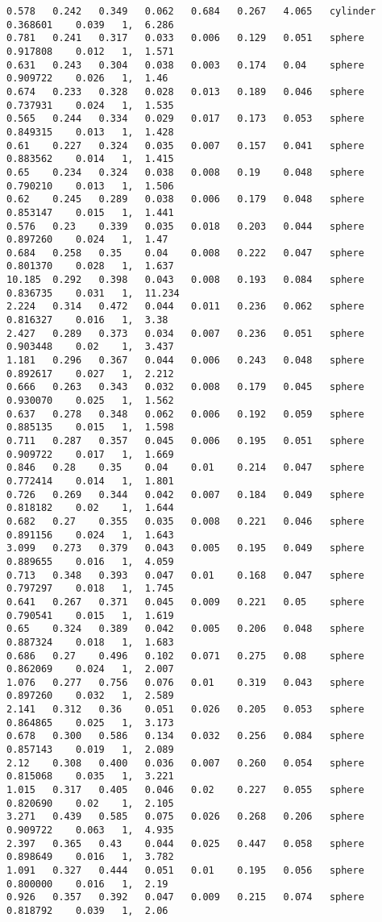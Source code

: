 {\fontsize{7.5}{10} \selectfont
\label{code:esferaAGC}
\begin{lstlisting}[caption={Datos obtenidos para la prueba de la esfera usando AGC.}]
0.578	0.242	0.349	0.062	0.684	0.267	4.065	cylinder	0.368601	0.039	1, 	6.286
0.781	0.241	0.317	0.033	0.006	0.129	0.051	sphere	0.917808	0.012	1, 	1.571
0.631	0.243	0.304	0.038	0.003	0.174	0.04	sphere	0.909722	0.026	1, 	1.46
0.674	0.233	0.328	0.028	0.013	0.189	0.046	sphere	0.737931	0.024	1, 	1.535
0.565	0.244	0.334	0.029	0.017	0.173	0.053	sphere	0.849315	0.013	1, 	1.428
0.61	0.227	0.324	0.035	0.007	0.157	0.041	sphere	0.883562	0.014	1, 	1.415
0.65	0.234	0.324	0.038	0.008	0.19	0.048	sphere	0.790210	0.013	1, 	1.506
0.62	0.245	0.289	0.038	0.006	0.179	0.048	sphere	0.853147	0.015	1, 	1.441
0.576	0.23	0.339	0.035	0.018	0.203	0.044	sphere	0.897260	0.024	1, 	1.47
0.684	0.258	0.35	0.04	0.008	0.222	0.047	sphere	0.801370	0.028	1, 	1.637
10.185	0.292	0.398	0.043	0.008	0.193	0.084	sphere	0.836735	0.031	1, 	11.234
2.224	0.314	0.472	0.044	0.011	0.236	0.062	sphere	0.816327	0.016	1, 	3.38
2.427	0.289	0.373	0.034	0.007	0.236	0.051	sphere	0.903448	0.02	1, 	3.437
1.181	0.296	0.367	0.044	0.006	0.243	0.048	sphere	0.892617	0.027	1, 	2.212
0.666	0.263	0.343	0.032	0.008	0.179	0.045	sphere	0.930070	0.025	1, 	1.562
0.637	0.278	0.348	0.062	0.006	0.192	0.059	sphere	0.885135	0.015	1, 	1.598
0.711	0.287	0.357	0.045	0.006	0.195	0.051	sphere	0.909722	0.017	1, 	1.669
0.846	0.28	0.35	0.04	0.01	0.214	0.047	sphere	0.772414	0.014	1, 	1.801
0.726	0.269	0.344	0.042	0.007	0.184	0.049	sphere	0.818182	0.02	1, 	1.644
0.682	0.27	0.355	0.035	0.008	0.221	0.046	sphere	0.891156	0.024	1, 	1.643
3.099	0.273	0.379	0.043	0.005	0.195	0.049	sphere	0.889655	0.016	1, 	4.059
0.713	0.348	0.393	0.047	0.01	0.168	0.047	sphere	0.797297	0.018	1, 	1.745
0.641	0.267	0.371	0.045	0.009	0.221	0.05	sphere	0.790541	0.015	1, 	1.619
0.65	0.324	0.389	0.042	0.005	0.206	0.048	sphere	0.887324	0.018	1, 	1.683
0.686	0.27	0.496	0.102	0.071	0.275	0.08	sphere	0.862069	0.024	1, 	2.007
1.076	0.277	0.756	0.076	0.01	0.319	0.043	sphere	0.897260	0.032	1, 	2.589
2.141	0.312	0.36	0.051	0.026	0.205	0.053	sphere	0.864865	0.025	1, 	3.173
0.678	0.300	0.586	0.134	0.032	0.256	0.084	sphere	0.857143	0.019	1, 	2.089
2.12	0.308	0.400	0.036	0.007	0.260	0.054	sphere	0.815068	0.035	1, 	3.221
1.015	0.317	0.405	0.046	0.02	0.227	0.055	sphere	0.820690	0.02	1, 	2.105
3.271	0.439	0.585	0.075	0.026	0.268	0.206	sphere	0.909722	0.063	1, 	4.935
2.397	0.365	0.43	0.044	0.025	0.447	0.058	sphere	0.898649	0.016	1, 	3.782
1.091	0.327	0.444	0.051	0.01	0.195	0.056	sphere	0.800000	0.016	1, 	2.19
0.926	0.357	0.392	0.047	0.009	0.215	0.074	sphere	0.818792	0.039	1, 	2.06

\end{lstlisting}}
